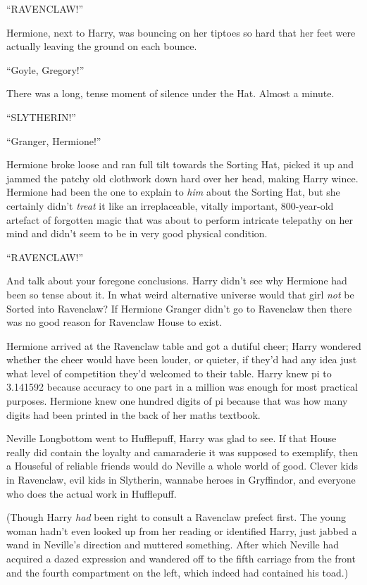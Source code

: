 ``RAVENCLAW!''

Hermione, next to Harry, was bouncing on her tiptoes so hard that her
feet were actually leaving the ground on each bounce.

``Goyle, Gregory!''

There was a long, tense moment of silence under the Hat. Almost a
minute.

``SLYTHERIN!''

``Granger, Hermione!''

Hermione broke loose and ran full tilt towards the Sorting Hat, picked
it up and jammed the patchy old clothwork down hard over her head,
making Harry wince. Hermione had been the one to explain to \emph{him}
about the Sorting Hat, but she certainly didn't \emph{treat} it like an
irreplaceable, vitally important, 800-year-old artefact of forgotten
magic that was about to perform intricate telepathy on her mind and
didn't seem to be in very good physical condition.

``RAVENCLAW!''

And talk about your foregone conclusions. Harry didn't see why Hermione
had been so tense about it. In what weird alternative universe would
that girl \emph{not} be Sorted into Ravenclaw? If Hermione Granger
didn't go to Ravenclaw then there was no good reason for Ravenclaw House
to exist.

Hermione arrived at the Ravenclaw table and got a dutiful cheer; Harry
wondered whether the cheer would have been louder, or quieter, if they'd
had any idea just what level of competition they'd welcomed to their
table. Harry knew pi to 3.141592 because accuracy to one part in a
million was enough for most practical purposes. Hermione knew one
hundred digits of pi because that was how many digits had been printed
in the back of her maths textbook.

Neville Longbottom went to Hufflepuff, Harry was glad to see. If that
House really did contain the loyalty and camaraderie it was supposed to
exemplify, then a Houseful of reliable friends would do Neville a whole
world of good. Clever kids in Ravenclaw, evil kids in Slytherin, wannabe
heroes in Gryffindor, and everyone who does the actual work in
Hufflepuff.

(Though Harry \emph{had} been right to consult a Ravenclaw prefect
first. The young woman hadn't even looked up from her reading or
identified Harry, just jabbed a wand in Neville's direction and muttered
something. After which Neville had acquired a dazed expression and
wandered off to the fifth carriage from the front and the fourth
compartment on the left, which indeed had contained his toad.)

